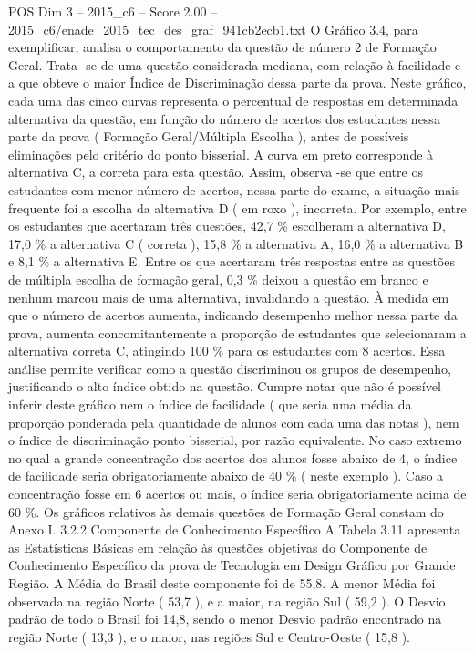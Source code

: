 \begin{textsample}{POS Dim 3 – 2015\_c6 – Score 2.00 – 2015\_c6/enade\_2015\_tec\_des\_graf\_941cb2ecb1.txt}
O Gráfico 3.4, para exemplificar, analisa o comportamento da questão de número 2 de Formação Geral.
Trata -se de uma questão considerada mediana, com relação à facilidade e a que obteve o maior Índice de Discriminação dessa parte da prova.
Neste gráfico, cada uma das cinco curvas representa o percentual de respostas em determinada alternativa da questão, em função do número de acertos dos estudantes nessa parte da prova ( Formação Geral/Múltipla Escolha ), antes de possíveis eliminações pelo critério do ponto bisserial.
A curva em preto corresponde à alternativa C, a correta para esta questão.
Assim, observa -se que entre os estudantes com menor número de acertos, nessa parte do exame, a situação mais frequente foi a escolha da alternativa D ( em roxo ), incorreta.
Por exemplo, entre os estudantes que acertaram três questões, 42,7 \% escolheram a alternativa D, 17,0 \% a alternativa C ( correta ), 15,8 \% a alternativa A, 16,0 \% a alternativa B e 8,1 \% a alternativa E.
Entre os que acertaram três respostas entre as questões de múltipla escolha de formação geral, 0,3 \% deixou a questão em branco e nenhum marcou mais de uma alternativa, invalidando a questão.
À medida em que o número de acertos aumenta, indicando desempenho melhor nessa parte da prova, aumenta concomitantemente a proporção de estudantes que selecionaram a alternativa correta C, atingindo 100 \% para os estudantes com 8 acertos.
Essa análise permite verificar como a questão discriminou os grupos de desempenho, justificando o alto índice obtido na questão.
Cumpre notar que não é possível inferir deste gráfico nem o índice de facilidade ( que seria uma média da proporção ponderada pela quantidade de alunos com cada uma das notas ), nem o índice de discriminação ponto bisserial, por razão equivalente.
No caso extremo no qual a grande concentração dos acertos dos alunos fosse abaixo de 4, o índice de facilidade seria obrigatoriamente abaixo de 40 \% ( neste exemplo ).
Caso a concentração fosse em 6 acertos ou mais, o índice seria obrigatoriamente acima de 60 \%.
Os gráficos relativos às demais questões de Formação Geral constam do Anexo I. 3.2.2 Componente de Conhecimento Específico A Tabela 3.11 apresenta as Estatísticas Básicas em relação às questões objetivas do Componente de Conhecimento Específico da prova de Tecnologia em Design Gráfico por Grande Região.
A Média do Brasil deste componente foi de 55,8.
A menor Média foi observada na região Norte ( 53,7 ), e a maior, na região Sul ( 59,2 ).
O Desvio padrão de todo o Brasil foi 14,8, sendo o menor Desvio padrão encontrado na região Norte ( 13,3 ), e o maior, nas regiões Sul e Centro-Oeste ( 15,8 ).

\end{textsample}
